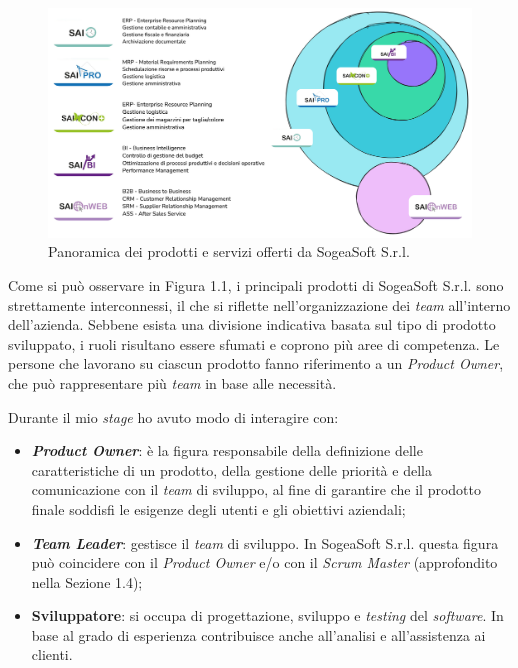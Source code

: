     \begin{figure}
        \centering
        \includegraphics[width=0.9\linewidth]{BCS-Tessi/images/Sogea_prodotti.png}
        \caption[Prodotti di SogeaSoft S.r.l.]{Panoramica dei prodotti e servizi offerti da SogeaSoft S.r.l.}
        \label{fig:panoramica_prodotti}
    \end{figure}

    \noindent Come si può osservare in Figura 1.1, i principali prodotti di SogeaSoft S.r.l. sono strettamente interconnessi, il che si riflette nell’organizzazione dei \textit{team} all’interno dell’azienda. Sebbene esista una divisione indicativa basata sul tipo di prodotto sviluppato, i ruoli risultano essere sfumati e coprono più aree di competenza. 
    \noindent Le persone che lavorano su ciascun prodotto fanno riferimento a un \textit{Product Owner}, che può rappresentare più \textit{team} in base alle necessità.

    \noindent Durante il mio \textit{stage} ho avuto modo di interagire con: 
    \begin{itemize}
        \item \textbf{\textit{Product Owner}}: è la figura responsabile della definizione delle caratteristiche di un prodotto, della gestione delle priorità e della comunicazione con il \textit{team} di sviluppo, al fine di garantire che il prodotto finale soddisfi le esigenze degli utenti e gli obiettivi aziendali;
        
        \item \textbf{\textit{Team Leader}}: gestisce il \textit{team} di sviluppo. In SogeaSoft S.r.l. questa figura può coincidere con il \textit{Product Owner} e/o con il \textit{Scrum Master} (approfondito nella Sezione 1.4);
        \item \textbf{Sviluppatore}: si occupa di progettazione, sviluppo e \textit{testing} del \textit{software}. In base al grado di esperienza contribuisce anche all'analisi e all'assistenza ai clienti. 
    \end{itemize}


